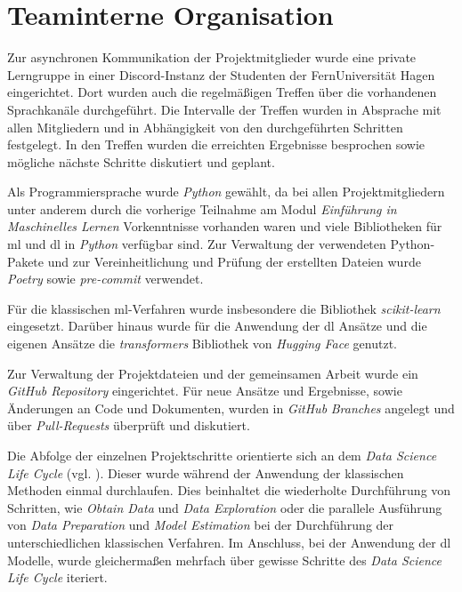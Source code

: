 \section{Teaminterne Organisation}\label{sec:teaminterneorganisation}

Zur asynchronen Kommunikation der Projektmitglieder wurde eine private Lerngruppe in einer Discord-Instanz der Studenten der FernUniversität Hagen eingerichtet.
Dort wurden auch die regelmäßigen Treffen über die vorhandenen Sprachkanäle durchgeführt.
Die Intervalle der Treffen wurden in Absprache mit allen Mitgliedern und in Abhängigkeit von den durchgeführten Schritten festgelegt.
In den Treffen wurden die erreichten Ergebnisse besprochen sowie mögliche nächste Schritte diskutiert und geplant.

Als Programmiersprache wurde \textit{Python} gewählt, da bei allen Projektmitgliedern unter anderem durch die vorherige Teilnahme am Modul \textit{Einführung in Maschinelles Lernen} Vorkenntnisse vorhanden waren und viele Bibliotheken für \gls{ml} und \gls{dl} in \textit{Python} verfügbar sind.
Zur Verwaltung der verwendeten Python-Pakete und zur Vereinheitlichung und Prüfung der erstellten Dateien wurde \textit{Poetry} \cite{poetry2025} sowie \textit{pre-commit} \cite{precommit2025} verwendet.

Für die klassischen \gls{ml}-Verfahren wurde insbesondere die Bibliothek \textit{scikit-learn} eingesetzt.
Darüber hinaus wurde für die Anwendung der \gls{dl} Ansätze und die eigenen Ansätze die \textit{transformers} Bibliothek von \textit{Hugging Face} genutzt.

Zur Verwaltung der Projektdateien und der gemeinsamen Arbeit wurde ein \textit{GitHub Repository} \cite{githubrepo2025} eingerichtet.
Für neue Ansätze und Ergebnisse, sowie Änderungen an Code und Dokumenten, wurden in \textit{GitHub} \textit{Branches} angelegt und über \textit{Pull-Requests} überprüft und diskutiert.

Die Abfolge der einzelnen Projektschritte orientierte sich an dem \textit{Data Science Life Cycle} (vgl. \cite[Abb. 2]{Stodden2020}).
Dieser wurde während der Anwendung der klassischen Methoden einmal durchlaufen.
Dies beinhaltet die wiederholte Durchführung von Schritten, wie \textit{Obtain Data} und \textit{Data Exploration} oder die parallele Ausführung von \textit{Data Preparation} und \textit{Model Estimation} bei der Durchführung der unterschiedlichen klassischen Verfahren.
Im Anschluss, bei der Anwendung der \gls{dl} Modelle, wurde gleichermaßen mehrfach über gewisse Schritte des \textit{Data Science Life Cycle} iteriert.
